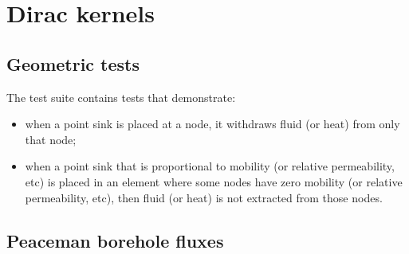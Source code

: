 \chapter{Dirac kernels}
\section{Geometric tests}

The test suite contains tests that demonstrate:
\begin{itemize}
\item when a point sink is placed at a node, it withdraws fluid (or heat) from only that node;
\item when a point sink that is proportional to mobility (or relative
  permeability, etc) is placed in an element where some nodes have
  zero mobility (or relative permeability, etc), then fluid (or heat)
  is not extracted from those nodes.
\end{itemize}

\section{Peaceman borehole fluxes}

